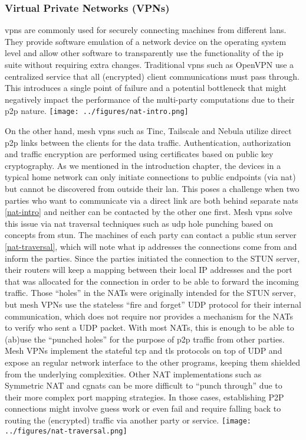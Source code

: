 \documentclass[
]{article}
\begin{document}
\hypertarget{virtual-private-networks-vpns}{%
  \subsubsection{Virtual Private Networks
    (VPNs)}\label{virtual-private-networks-vpns}}

\glspl{vpn} are commonly used for securely connecting machines from
different \glspl{lan}. They provide software emulation of a network
device on the operating system level and allow other software to
transparently use the functionality of the \gls{ip} suite without
requiring extra changes. Traditional \glspl{vpn} such as
OpenVPN\autocite{openVPNDocs} use a centralized service that all
(encrypted) client communications must pass through. This introduces a
single point of failure and a potential bottleneck that might negatively
impact the performance of the multi-party computations due to their
\gls{p2p} nature. \texttt{[image: ../figures/nat-intro.png]}

On the other hand, mesh \glspl{vpn} such as Tinc\autocite{tincDocs},
Tailscale\autocite{tailscaleDocs} and Nebula\autocite{nebulaDocs}
utilize direct \gls{p2p} links between the clients for the data traffic.
Authentication, authorization and traffic encryption are performed using
certificates based on public key cryptography. As we mentioned in the
introduction chapter, the devices in a typical home network can only
initiate connections to public endpoints (via \gls{nat}) but cannot be
discovered from outside their \gls{lan}. This poses a challenge when two
parties who want to communicate via a direct link are both behind
separate \glspl{nat} \ref{nat-intro} and neither can be contacted by the
other one first. Mesh \glspl{vpn} solve this issue via \gls{nat}
traversal techniques such as \gls{udp} hole punching based on concepts
from \gls{stun}. The machines of each party can contact a public
\gls{stun} server \ref{nat-traversal}, which will note what \gls{ip}
addresses the connections come from and inform the parties. Since the
parties initiated the connection to the STUN server, their routers will
keep a mapping between their local IP addresses and the port that was
allocated for the connection in order to be able to forward the incoming
traffic. Those ``holes'' in the NATs were originally intended for the
STUN server, but mesh VPNs use the stateless ``fire and forget'' UDP
protocol for their internal communication, which does not require nor
provides a mechanism for the NATs to verify who sent a UDP packet. With
most NATs, this is enough to be able to (ab)use the ``punched holes''
for the purpose of \gls{p2p} traffic from other parties. Mesh VPNs
implement the stateful \gls{tcp} and \gls{tls} protocols on top of UDP
and expose an regular network interface to the other programs, keeping
them shielded from the underlying complexities. Other NAT
implementations such as Symmetric NAT and \glspl{cgnat} can be more
difficult to ``punch through'' due to their more complex port mapping
strategies. In those cases, establishing P2P connections might involve
guess work or even fail and require falling back to routing the
(encrypted) traffic via another party or service.
\texttt{[image: ../figures/nat-traversal.png]}
\end{document}
